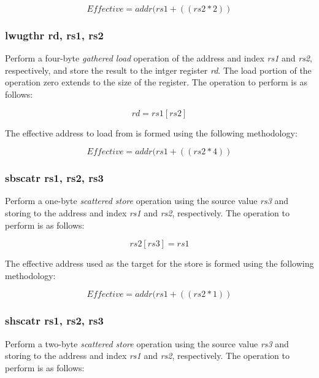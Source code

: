\documentclass{article}
\begin{document}
\begin{equation}
Effective = addr(rs1 + ((rs2 * 2))
\end{equation}

\subsubsection{lwugthr rd, rs1, rs2}

Perform a four-byte \emph{gathered load} operation of the address and
index \emph{rs1} and \emph{rs2}, respectively, and store the result
to the intger register \emph{rd}.  The load portion of the operation
zero extends to the size of the register.
The operation to perform is as follows:

\begin{equation}
rd = rs1[rs2]
\end{equation}

The effective address to load
from is formed using the following methodology:

\begin{equation}
Effective = addr(rs1 + ((rs2 * 4))
\end{equation}


\subsubsection{sbscatr rs1, rs2, rs3}

Perform a one-byte \emph{scattered store} operation using the 
source value \emph{rs3} and storing to the address and index
\emph{rs1} and \emph{rs2}, respectively.  The operation to
perform is as follows: 

\begin{equation}
rs2[rs3] = rs1
\end{equation}

The effective address used as the target
for the store is formed using the following methodology:

\begin{equation}
Effective = addr(rs1 + ((rs2 * 1))
\end{equation}

\subsubsection{shscatr rs1, rs2, rs3}

Perform a two-byte \emph{scattered store} operation using the 
source value \emph{rs3} and storing to the address and index
\emph{rs1} and \emph{rs2}, respectively.  The operation to
perform is as follows: 
\end{document}
